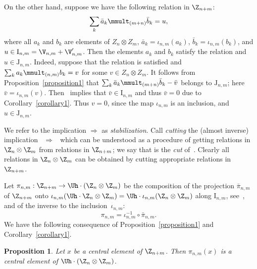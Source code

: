 \documentclass[pdftex]{sigma}
\newtheorem{prop}[theorem]{Proposition}
\numberwithin{equation}{section}
\begin{document}
On the other hand, suppose we have the following relation in $\Z_{n+m}$:
\begin{gather}
 \sum_k \bar{a}_k\mmult_{(m+n)} \bar{b}_k=u  , \label{st3}
\end{gather}
where all $a_k$ and $b_k$ are elements of $Z_n\otimes Z_m$, $\bar{a}_k=\iota_{n,m}(a_k)$, $\bar{b}_k=\iota_{n,m}(b_k)$, and
$u\in \mathrm{I}_{n,m}=\V_{n,m}
+\V'_{n,m}$. Then the elements $a_k$ and $b_k$ satisfy the relation  and  $u\in \mathrm{J}_{n,m}$. Indeed, suppose that the relation  is
satisf\/ied and $ \sum_k a_k\mmult_{(n,m)} b_k=v$ for some $v\in Z_n\otimes Z_m$. It follows from Proposition~\ref{proposition1} that $\sum_k \bar{a}_k\mmult_{(m+n)} \bar{b}_k-\bar{v}$ belongs to $\mathrm{J}_{n,m}$; here $\bar{v}=\iota_{n,m}(v)$.
Then~ implies that $\bar{v}\in \mathrm{I}_{n,m}$ and thus $\bar{v}=0$ due to Corollary~\ref{corollary1}. Thus $v=0$, since the map $\iota_{n,m}$ is an
inclusion, and $u\in\mathrm{J}_{n,m}$.


We refer to the implication  $\Rightarrow$  as   {\it stabilization}.
Call {\it cutting} the (almost inverse) implication ~$\Rightarrow$~ which can be understood as a procedure of getting
relations in $\Z_{n}\otimes\Z_m$ from relations in $\Z_{n+m}$; we say that  is the {\it cut} of~.
Clearly all relations in $\Z_{n}\otimes\Z_m$ can be obtained by cutting appropriate relations in~$\Z_{n+m}$.


Let $\pi_{n,m}:\Z_{n+m}\to\Uh\cdot\left(\Z_{n}\otimes\Z_m\right)$ be the composition of the projection $\bar{\pi}_{n,m}$ of $\Z_{n+m}$ onto
$\iota_{n,m}(\Uh\cdot\Z_n\otimes\Z_m)=\Uh\cdot\iota_{n,m}(\Z_n\otimes\Z_m)$ along $\mathrm{I}_{n,m}$, see~,
and of the inverse to the inclusion~$\iota_{n,m}$:
\[
\pi_{n,m}=\iota_{n,m}^{-1}\circ\bar{\pi}_{n,m}  .
\]
We have the following consequence of Proposition~\ref{proposition1} and Corollary~\ref{corollary1}.

\begin{prop}
\label{proposition2}
Let $x$ be a central element of $\Z_{n+m}$. Then $\pi_{n,m}(x)$ is a central element of
$\Uh\cdot\left(\Z_{n}\otimes\Z_m\right)$.
\end{prop}
\end{document}
